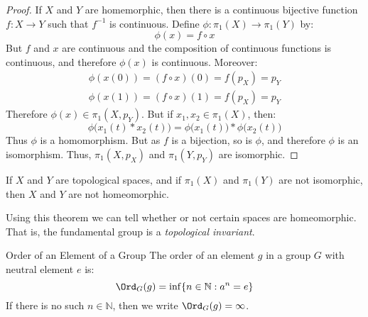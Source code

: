 \documentclass[crop=false,class=book,oneside]{standalone}                      %
\begin{document}
            \begin{proof}
                If $X$ and $Y$ are homemorphic, then there is
                a continuous bijective function
                $f:X\rightarrow{Y}$ such that
                $f^{-1}$ is continuous. Define
                $\phi:\pi_{1}(X)\rightarrow\pi_{1}(Y)$ by:
                \begin{equation}
                    \phi(x)=f\circ{x}
                \end{equation}
                But $f$ and $x$ are continuous and the composition
                of continuous functions is continuous, and therefore
                $\phi(x)$ is continuous. Moreover:
                \begin{align}
                    \phi(x(0))=(f\circ{x})(0)=f(p_{X})=p_{Y}\\
                    \phi(x(1))=(f\circ{x})(1)=f(p_{X})=p_{Y}
                \end{align}
                Therefore $\phi(x)\in\pi_{1}(X,p_{Y})$.
                But if $x_{1},x_{2}\in\pi_{1}(X)$, then:
                \begin{equation}
                    \phi\big(x_{1}(t)*x_{2}(t)\big)
                    =\phi\big(x_{1}(t)\big)*\phi\big(x_{2}(t)\big)
                \end{equation}
                Thus
                $\phi$ is a homomorphism. But as
                $f$ is a bijection, so is $\phi$, and
                therefore $\phi$ is an isomorphism.
                Thus, $\pi_{1}(X,p_{X})$ and
                $\pi_{1}(Y,p_{Y})$ are isomorphic.
            \end{proof}
            \begin{theorem}
                If $X$ and $Y$ are topological spaces,
                and if $\pi_{1}(X)$ and $\pi_{1}(Y)$
                are not isomorphic, then
                $X$ and $Y$ are not homeomorphic.
            \end{theorem}
            Using this theorem we can tell whether or not
            certain spaces are homeomorphic. That is,
            the fundamental group is a
            \textit{topological invariant}.
            \begin{ldefinition}{Order of an Element of a Group}
                The order of an element $g$ in a group $G$
                with neutral element $e$ is:
                \begin{equation}
                    \Ord_{G}(g)=\inf\{n\in\mathbb{N}:a^{n}=e\}
                \end{equation}
                If there is no such $n\in\mathbb{N}$, then we write
                $\Ord_{G}(g)=\infty$.
            \end{ldefinition}
\end{document}
